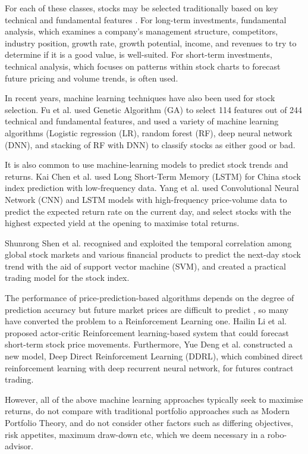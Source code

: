 \documentclass{article}
\begin{document}
For each of these classes, stocks may be selected traditionally based on key technical and fundamental features \cite{schwabbrokerage}. For long-term investments, fundamental analysis, which examines a company’s management structure, competitors, industry position, growth rate, growth potential, income, and revenues to try to determine if it is a good value, is well-suited. For short-term investments, technical analysis, which focuses on patterns within stock charts to forecast future pricing and volume trends, is often used.

In recent years, machine learning techniques have also been used for stock selection. Fu et al. \cite{fu2018machine} used Genetic Algorithm (GA) to select 114 features out of 244 technical and fundamental features, and used a variety of machine learning algorithms (Logistic regression (LR), random forest (RF), deep neural network (DNN), and stacking of RF with DNN) to classify stocks as either good or bad.

It is also common to use machine-learning models to predict stock trends and returns. Kai Chen et al. \cite{Chen2015ALM} used Long Short-Term Memory (LSTM) for China stock index prediction with low-frequency data. Yang et al. \cite{yang2019deep} used Convolutional Neural Network (CNN) and LSTM models with high-frequency price-volume data to predict the expected return rate on the current day, and select stocks with the highest expected yield at the opening to maximise total returns.

Shunrong Shen et al. \cite{shen2012stock} recognised and exploited the temporal correlation among global stock markets and various financial products to predict the next-day stock trend with the aid of support vector machine (SVM), and created a practical trading model for the stock index.

The performance of price-prediction-based algorithms depends on the degree of prediction accuracy but future market prices are difficult to predict \cite{jiang2017deep}, so many have converted the problem to a Reinforcement Learning one. Hailin Li et al. \cite{hailin2007} proposed actor-critic Reinforcement learning-based system that could forecast short-term stock price movements. Furthermore, Yue Deng et al. \cite{ddrl2016} constructed a new model, Deep Direct Reinforcement Learning (DDRL), which combined direct reinforcement learning with deep recurrent neural network, for futures contract trading.

However, all of the above machine learning approaches typically seek to maximise returns, do not compare with traditional portfolio approaches such as Modern Portfolio Theory, and do not consider other factors such as differing objectives, risk appetites, maximum draw-down etc, which we deem necessary in a robo-advisor.
\end{document}
